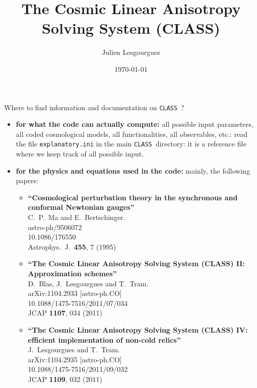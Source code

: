 \documentclass{article}
\newcommand\CLASS{{\tt CLASS}~}
\begin{document}
\title{The Cosmic Linear Anisotropy Solving System (CLASS)}

\author{Julien Lesgourgues}


\date{\today}


\maketitle


Where to find information and documentation on \CLASS?
\begin{itemize}
\item {\bf for what the code can actually compute:} all possible input parameters, all coded cosmological models, all functionalities, all observables, etc.: read the file {\tt explanatory.ini} in the main \CLASS directory: it is a reference file where we keep track of all possible input.
\item {\bf for the physics and equations used in the code:} mainly, the following papers:
\begin{itemize}
\item%
{\bf ``Cosmological perturbation theory in the synchronous and conformal Newtonian gauges''}
  \\{}C.~P.~Ma and E.~Bertschinger.
  \\{}astro-ph/9506072
  \\{}10.1086/176550
  \\{}Astrophys.\ J.\  {\bf 455}, 7 (1995)

\item%
{\bf ``The Cosmic Linear Anisotropy Solving System (CLASS) II: Approximation schemes''}
  \\{}D.~Blas, J.~Lesgourgues and T.~Tram.
  \\{}arXiv:1104.2933 [astro-ph.CO]
  \\{}10.1088/1475-7516/2011/07/034
  \\{}JCAP {\bf 1107}, 034 (2011)

\item%
{\bf ``The Cosmic Linear Anisotropy Solving System (CLASS) IV: efficient implementation of non-cold relics''}
  \\{}J.~Lesgourgues and T.~Tram.
  \\{}arXiv:1104.2935 [astro-ph.CO]
  \\{}10.1088/1475-7516/2011/09/032
  \\{}JCAP {\bf 1109}, 032 (2011)


\end{itemize}
\end{itemize}
\end{document}
